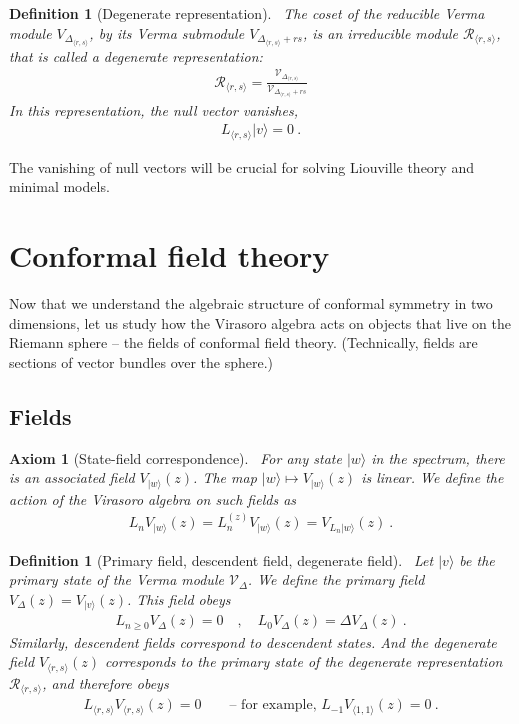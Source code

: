 \documentclass[12pt, a4paper]{article}
\theoremstyle{break}
\newtheorem{hyp}[exo]{Axiom}
\newtheorem{defn}[exo]{Definition}
\begin{document}
\begin{defn}[Degenerate representation]
 ~\label{def:deg}
The coset of the reducible Verma module $V_{\Delta_{\langle r,s\rangle}}$, by its Verma submodule $V_{\Delta_{\langle r,s\rangle}+rs}$, is an irreducible module $\mathcal{R}_{\langle r,s\rangle}$, that is called a degenerate representation:
\begin{align}
 \mathcal{R}_{\langle r,s\rangle} = \frac{\mathcal V_{\Delta_{\langle r,s\rangle}}}{\mathcal V_{\Delta_{\langle r,s\rangle}+rs}}
\end{align}
In this representation, the null vector vanishes,
\begin{align}
 L_{\langle r,s\rangle}|v\rangle = 0\ .
\end{align}
\end{defn}
The vanishing of null vectors will be crucial for solving Liouville theory and minimal models.


\section{Conformal field theory}

Now that we understand the algebraic structure of conformal symmetry in two dimensions, let us study how the Virasoro algebra acts on objects that live on the Riemann sphere -- the fields of conformal field theory. (Technically, fields are sections of vector bundles over the sphere.)

\subsection{Fields}

\begin{hyp}[State-field correspondence]
 ~\label{hyp:sfc}
For any state $|w\rangle$ in the spectrum, there is an associated field $V_{|w\rangle}(z)$. The map $|w\rangle \mapsto V_{|w\rangle}(z)$ is linear. We define the action of the Virasoro algebra on such fields as 
\begin{align}
 L_n V_{|w\rangle}(z) =  L_n^{(z)} V_{|w\rangle}(z) = V_{L_n|w\rangle}(z)\ .
\end{align}
\end{hyp}

\begin{defn}[Primary field, descendent field, degenerate field]
~\label{def:pfdf}
Let $|v\rangle$ be the primary state of the Verma module $\mathcal V_\Delta$.
We define the primary field $V_\Delta(z)=V_{|v\rangle}(z)$. This field obeys
\begin{align}
 L_{n\geq 0} V_\Delta(z) = 0 \quad , \quad L_0 V_\Delta(z) = \Delta V_\Delta(z)\ .
\end{align}
Similarly, descendent fields correspond to descendent states. And the degenerate field $V_{\langle r,s\rangle}(z)$ corresponds to the primary state of the degenerate representation $\mathcal{R}_{\langle r,s\rangle}$, and therefore obeys 
\begin{align}
 L_{\langle r, s\rangle} V_{\langle r,s\rangle}(z) = 0\qquad \text{-- for example, \ } L_{-1}V_{\langle 1,1\rangle}(z) = 0\ .
\end{align}
\end{defn}
\end{document}
